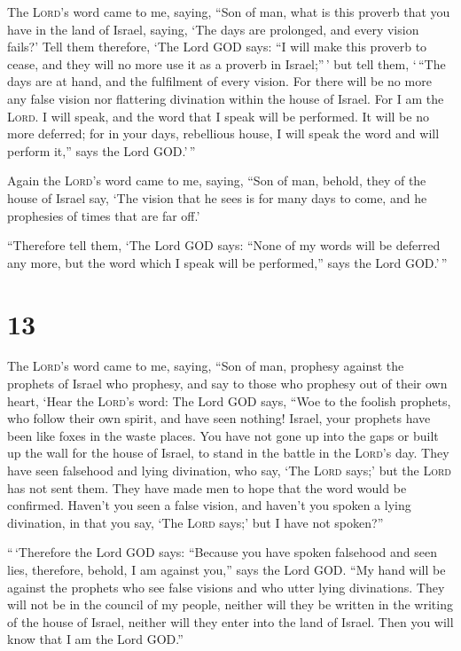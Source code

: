  The \textsc{Lord}'s word came to me, saying,
 ``Son of man, what is this proverb that you have in the
land of Israel, saying, `The days are prolonged, and every vision
fails?'  Tell them therefore, `The Lord GOD says: ``I
will make this proverb to cease, and they will no more use it as a
proverb in Israel;''\,' but tell them, `\,``The days are at hand, and
the fulfilment of every vision.  For there will be no
more any false vision nor flattering divination within the house of
Israel.  For I am the \textsc{Lord}. I will speak, and
the word that I speak will be performed. It will be no more deferred;
for in your days, rebellious house, I will speak the word and will
perform it,'' says the Lord GOD.'\,''

 Again the \textsc{Lord}'s word came to me, saying,
 ``Son of man, behold, they of the house of Israel say,
`The vision that he sees is for many days to come, and he prophesies of
times that are far off.'

 ``Therefore tell them, `The Lord GOD says: ``None of my
words will be deferred any more, but the word which I speak will be
performed,'' says the Lord GOD.'\,''

\hypertarget{section-12}{%
\section{13}\label{section-12}}

 The \textsc{Lord}'s word came to me, saying,
 ``Son of man, prophesy against the prophets of Israel who
prophesy, and say to those who prophesy out of their own heart, `Hear
the \textsc{Lord}'s word:  The Lord GOD says, ``Woe to the
foolish prophets, who follow their own spirit, and have seen nothing!
 Israel, your prophets have been like foxes in the waste
places.  You have not gone up into the gaps or built up
the wall for the house of Israel, to stand in the battle in the
\textsc{Lord}'s day.  They have seen falsehood and lying
divination, who say, `The \textsc{Lord} says;' but the \textsc{Lord} has
not sent them. They have made men to hope that the word would be
confirmed.  Haven't you seen a false vision, and haven't
you spoken a lying divination, in that you say, `The \textsc{Lord}
says;' but I have not spoken?''

 ``\,`Therefore the Lord GOD says: ``Because you have
spoken falsehood and seen lies, therefore, behold, I am against you,''
says the Lord GOD.  ``My hand will be against the prophets
who see false visions and who utter lying divinations. They will not be
in the council of my people, neither will they be written in the writing
of the house of Israel, neither will they enter into the land of Israel.
Then you will know that I am the Lord GOD.''

